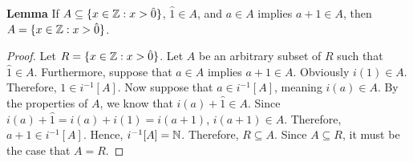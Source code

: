 \newpage
\noindent \textbf{Lemma} If \(A \subseteq \{x \in \mathbb{Z} : x > \hat{0}\}\), \(\hat{1} \in A\), and \(a \in A\) implies \(a + 1 \in A\), then \(A = \{x \in \mathbb{Z} : x > \hat{0}\}\).
\begin{proof}
    Let \(R = \{x \in \mathbb{Z} : x > \hat{0}\}\). Let \(A\) be an arbitrary subset of \(R\) such that \(\hat{1} \in A\). Furthermore, suppose that \(a \in A\) implies \(a+1 \in A\).
    Obviously \(i(1) \in A\). Therefore, \(1 \in i^{-1}[A]\). Now suppose that \(a \in i^{-1}[A]\), meaning \(i(a) \in A\). By the properties of \(A\), we know that \(i(a)+\hat{1} \in A\). Since \(i(a) + \hat{1} = i(a) + i(1) = i(a+1)\), \(i(a+1) \in A\).
    Therefore, \(a+1 \in i^{-1}[A]\). Hence, \(i^{-1}[A] = \mathbb{N}\). Therefore, \(R \subseteq A\). Since \(A \subseteq R\), it must be the case that \(A = R\).
\end{proof}



